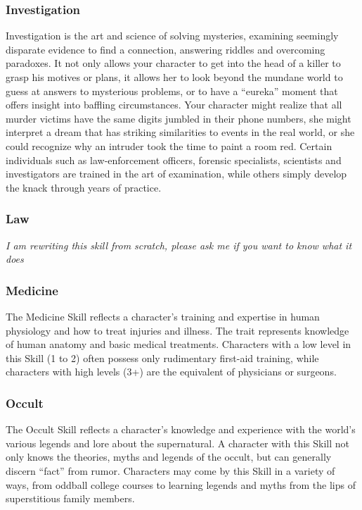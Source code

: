 \documentclass["../Misguided by Starlight.tex"]{subfiles}
\begin{document}
\subsubsection{Investigation}
Investigation is the art and science of solving mysteries, examining seemingly disparate evidence to find a connection, answering riddles and overcoming paradoxes. It not only allows your character to get into the head of a killer to grasp his motives or plans, it allows her to look beyond the mundane world to guess at answers to mysterious problems, or to have a “eureka” moment that offers insight into baffling circumstances. Your character might realize that all murder victims have the same digits jumbled in their phone numbers, she might interpret a dream that has striking similarities to events in the real world, or she could recognize why an intruder took the time to paint a room red. Certain individuals such as law-enforcement officers, forensic specialists, scientists and investigators are trained in the art of examination, while others simply develop the knack through years of practice.

\subsubsection{Law}
\emph{I am rewriting this skill from scratch, please ask me if you want to know what it does}

\subsubsection{Medicine}
The Medicine Skill reflects a character’s training and expertise in human physiology and how to treat injuries and illness. The trait represents knowledge of human anatomy and basic medical treatments. Characters with a low level in this Skill (1 to 2) often possess only rudimentary first-aid training, while characters with high levels (3+) are the equivalent of physicians or surgeons.

\subsubsection{Occult}
The Occult Skill reflects a character’s knowledge and experience with the world’s various legends and lore about the supernatural. A character with this Skill not only knows the theories, myths and legends of the occult, but can generally discern “fact” from rumor. Characters may come by this Skill in a variety of ways, from oddball college courses to learning legends and myths from the lips of superstitious family members.
\end{document}
